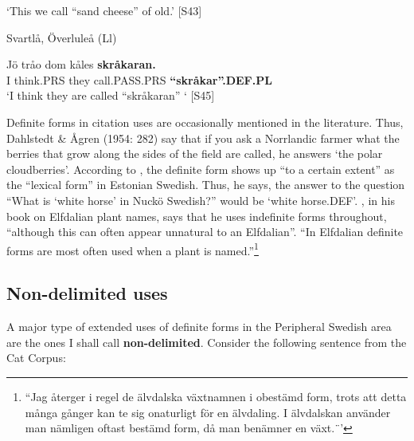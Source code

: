 \glt ‘This we call “sand cheese” of old.’ [S43]

\z

\item 

Svartlå, Överluleå (Ll)



 \ea\label{}
\gll Jö  tråo  dom  kåles  \textbf{skråkaran.}\\


I  think.PRS  they  call.PASS.PRS  \textbf{“skråkar”.DEF.PL}\\

\glt ‘I think they are called “skråkaran” ‘ [S45]

\z

Definite forms in citation uses are occasionally mentioned in the literature. Thus, Dahlstedt \& Ågren (1954: 282) say that if you ask a Norrlandic farmer what the berries that grow along the sides of the field are called, he answers  ‘the polar cloudberries’. According to \citet[82]{Lagman1979}, the definite form shows up “to a certain extent” as the “lexical form” in Estonian Swedish. Thus, he says, the answer to the question “What is ‘white horse’ in Nuckö Swedish?” would be  ‘white horse.DEF’. \citet[8]{Steensland1994}, in his book on Elfdalian plant names, says that he uses indefinite forms throughout, “although this can often appear unnatural to an Elfdalian”.  “In Elfdalian definite forms are most often used when a plant is named.”\footnote{ “Jag återger i regel de älvdalska växtnamnen i obestämd form, trots att detta många gånger kan te sig onaturligt för en älvdaling. I älvdalskan använder man nämligen oftast bestämd form, då man benämner en växt.¨’}


\subsection{\rmfamily Non-delimited uses}
\label{bkm:Ref105226557}
A major type of extended uses of definite forms in the Peripheral Swedish area are the ones I shall call \textbf{non-delimited}. Consider the following sentence from the Cat Corpus: 

